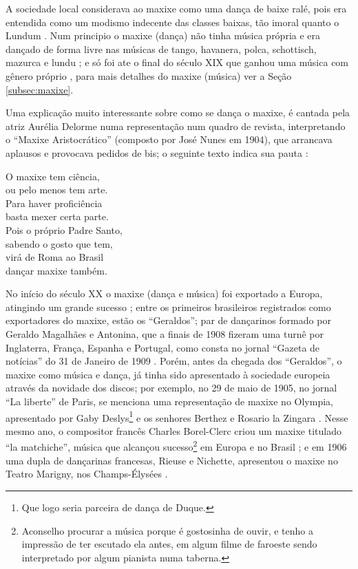 A sociedade local considerava ao maxixe como uma dança de baixe ralé, 
pois era entendida como um modismo indecente das classes baixas, tão imoral quanto o Lundum \cite[pp. 198]{dourado2004dicionario}.
Num principio o maxixe (dança) não tinha música própria e era dançado de forma livre nas músicas de 
tango, havanera, polca, schottisch, mazurca e lundu 
\cite[pp. 465]{marcondes1977enciclopedia} \cite[pp. 58]{tinhorao1986pequena}  
\cite[pp. 198]{dourado2004dicionario} \cite[pp. 62]{reinato2010musica}; 
e só foi ate o final do século XIX que ganhou uma música com gênero próprio \cite[pp. 465]{marcondes1977enciclopedia},
para mais detalhes do maxixe (música) ver a Seção \ref{subsec:maxixe}.

Uma explicação muito interessante sobre como se dança o maxixe, 
é cantada pela atriz Aurélia Delorme numa representação num quadro de revista, 
interpretando o ``Maxixe Aristocrático'' (composto por José Nunes em 1904), 
que arrancava aplausos e provocava pedidos de bis;
o seguinte texto indica sua pauta \cite[pp. 80-81]{efege1974maxixe} \cite{REIS2003}: 
\begin{citando}
O maxixe tem ciência,\\
ou pelo menos tem arte.\\
Para haver proficiência\\
basta mexer certa parte.\\
Pois o próprio Padre Santo,\\
sabendo o gosto que tem,\\
virá de Roma ao Brasil\\
dançar maxixe também.\\ 
\end{citando}


No início do século XX o maxixe (dança e música) foi exportado a Europa, atingindo um grande sucesso
\cite[pp. 465]{marcondes1977enciclopedia};
entre os primeiros brasileiros registrados como exportadores do maxixe, estão 
os ``Geraldos''; par de dançarinos formado por Geraldo Magalhães e Antonina,
 que a finais de 1908 fizeram uma turnê por Inglaterra, França, Espanha e Portugal,
como consta no jornal ``Gazeta de notícias'' do 31 de Janeiro de 1909 
\cite[pp. 3]{maxixegeraldos} \cite[pp. 79, 93]{tinhorao1986pequena}.
Porém, antes da chegada dos ``Geraldos'', o maxixe como música e dança, já tinha sido
apresentado à sociedade europeia através da novidade dos discos; por exemplo,
no 29 de maio de 1905, no jornal ``La liberte'' de Paris, se menciona uma representação de maxixe no Olympia,
apresentado por Gaby Deslys\footnote{Que logo seria parceira de dança de Duque.} e 
os senhores Berthez e Rosario la Zingara \cite[pp. 3]{maxixe1905}.
Nesse mesmo ano, o compositor francês Charles Borel-Clerc criou um maxixe titulado ``la matchiche'',
música que alcançou sucesso\footnote{Aconselho procurar a música porque é gostosinha de ouvir, 
e tenho a impressão de ter escutado ela antes, em algum filme de faroeste sendo interpretado por algum pianista numa taberna.} 
em Europa e no Brasil \cite[pp. 79]{tinhorao1986pequena} \cite[pp. 175]{delfino1998brasil} \cite[pp. 180]{dourado2004dicionario};
e em 1906 uma dupla de dançarinas francesas, Rieuse e Nichette, 
apresentou o maxixe no Teatro Marigny, nos Champs-Élysées \cite[pp. 79-80]{tinhorao1986pequena}.

